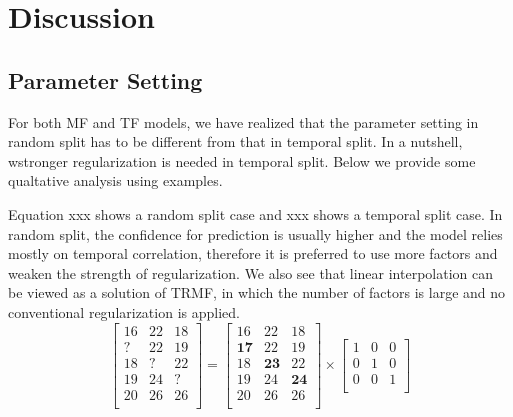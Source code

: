 \section{Discussion}  \label{sec:disc}



\subsection{Parameter Setting} \label{subsec:parameter}

For both MF and TF models, we have realized that the parameter setting in random split has to be different from that in temporal split. In a nutshell, wstronger regularization is needed in temporal split. Below we provide some qualtative analysis using examples. 

Equation xxx shows a random split case and xxx shows a temporal split case. In random split, the confidence for prediction is usually higher and the model relies mostly on temporal correlation, therefore it is preferred to use more factors and weaken the strength of regularization.
We also see that linear interpolation can be viewed as a solution of TRMF, in which the number of factors is large and no conventional regularization is applied. 
\begin{equation}
\label{randomSplit_matrix}
\begin{bmatrix}
16 & 22 & 18\\
 ? & 22 & 19\\
18 &  ?	& 22\\
19 & 24 &  ?\\
20 & 26 & 26\\
\end{bmatrix} 
= 
\begin{bmatrix}
16 & 22 & 18\\
\mathbf{17} & 22 & 19\\
18 & \mathbf{23}	& 22\\
19 & 24 & \mathbf{24}\\
20 & 26 & 26\\
\end{bmatrix} 
\times
\begin{bmatrix}
1 & 0 & 0\\
0 & 1 & 0\\
0 & 0 & 1\\
\end{bmatrix} 
\end{equation}

